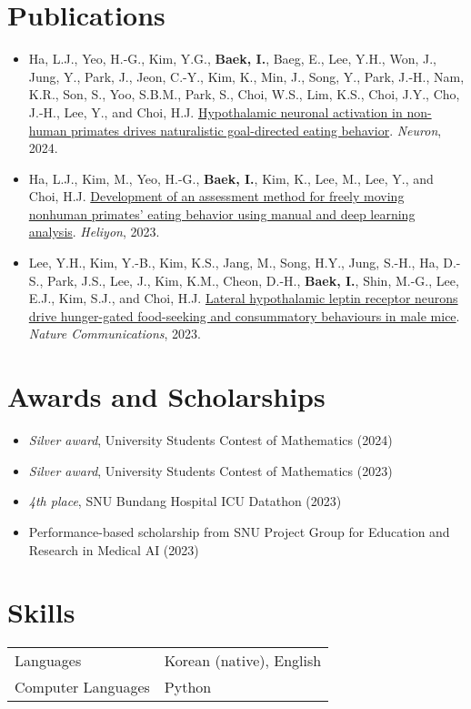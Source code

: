 \documentclass[10pt, a4paper]{article}
\newenvironment{customitemize}
	{\begin{itemize}[leftmargin=*, noitemsep, topsep=0pt, label=$\cdot$]}
	{\end{itemize}}
\begin{document}
\section*{Publications}
\begin{customitemize}
    \item Ha, L.J., Yeo, H.-G., Kim, Y.G., {\bf Baek, I.}, Baeg, E., Lee, Y.H., Won, J., Jung, Y., Park, J., Jeon, C.-Y., Kim, K., Min, J., Song, Y., Park, J.-H., Nam, K.R., Son, S., Yoo, S.B.M., Park, S., Choi, W.S., Lim, K.S., Choi, J.Y., Cho, J.-H., Lee, Y., and Choi, H.J. \href{https://doi.org/10.1016/j.neuron.2024.03.029}{Hypothalamic neuronal activation in non-human primates drives naturalistic goal-directed eating behavior}. {\it Neuron}, 2024. 
    \item Ha, L.J., Kim, M., Yeo, H.-G., {\bf Baek, I.}, Kim, K., Lee, M., Lee, Y., and Choi, H.J. \href{https://doi.org/10.1016/j.heliyon.2024.e25561}{Development of an assessment method for freely moving nonhuman primates' eating behavior using manual and deep learning analysis}. {\it Heliyon}, 2023. 
    \item Lee, Y.H., Kim, Y.-B., Kim, K.S., Jang, M., Song, H.Y., Jung, S.-H., Ha, D.-S., Park, J.S., Lee, J., Kim, K.M., Cheon, D.-H., {\bf Baek, I.}, Shin, M.-G., Lee, E.J., Kim, S.J., and Choi, H.J. \href{https://doi.org/10.1038/s41467-023-37044-4}{Lateral hypothalamic leptin receptor neurons drive hunger-gated food-seeking and consummatory behaviours in male mice}. {\it Nature Communications}, 2023. 
\end{customitemize}


\section*{Awards and Scholarships}
\begin{customitemize}
    \item \textit{Silver award}, University Students Contest of Mathematics (2024)
    \item \textit{Silver award}, University Students Contest of Mathematics (2023)
    \item \textit{4th place}, SNU Bundang Hospital ICU Datathon (2023)
    \item Performance-based scholarship from SNU Project Group for Education and Research in Medical AI (2023)
\end{customitemize}


\section*{Skills}
\begin{tabular}{ll}
    Languages & Korean (native), English \\
    Computer Languages & Python
\end{tabular}
\end{document}
